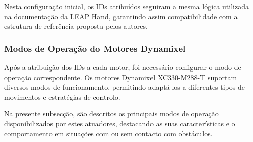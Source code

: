 Nesta configuração inicial, os IDs atribuídos seguiram a mesma lógica utilizada na documentação da LEAP Hand, garantindo assim compatibilidade com a estrutura de referência proposta pelos autores.

\subsubsection{Modos de Operação do Motores Dynamixel}

Após a atribuição dos IDs a cada motor, foi necessário configurar o modo de operação correspondente. Os motores Dynamixel XC330-M288-T suportam diversos modos de funcionamento, permitindo adaptá-los a diferentes tipos de movimentos e estratégias de controlo.

Na presente subsecção, são descritos os principais modos de operação disponibilizados por estes atuadores, destacando as suas características e o comportamento em situações com ou sem contacto com obstáculos.


